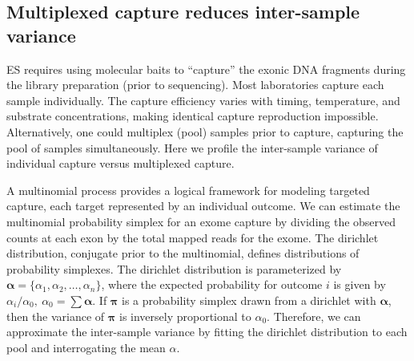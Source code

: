 \documentclass[11pt,letterpaper]{book}
\begin{document}
\hypertarget{multiplexed-capture-reduces-inter-sample-variance}{%
\subsection{Multiplexed capture reduces inter-sample variance}\label{multiplexed-capture-reduces-inter-sample-variance}}

ES requires using molecular baits to ``capture'' the exonic DNA fragments during the library preparation (prior to sequencing).
Most laboratories capture each sample individually.
The capture efficiency varies with timing, temperature, and substrate concentrations, making identical capture reproduction impossible.
Alternatively, one could multiplex (pool) samples prior to capture, capturing the pool of samples simultaneously.
Here we profile the inter-sample variance of individual capture versus multiplexed capture.

A multinomial process provides a logical framework for modeling targeted capture, each target represented by an individual outcome.
We can estimate the multinomial probability simplex for an exome capture by dividing the observed counts at each exon by the total mapped reads for the exome.
The dirichlet distribution, conjugate prior to the multinomial, defines distributions of probability simplexes.
The dirichlet distribution is parameterized by \(\boldsymbol{\alpha} = \{\alpha_1, \alpha_2, \dots, \alpha_n\}\), where the expected probability for outcome \(i\) is given by \(\alpha_i/\alpha_0,~\alpha_0 = \sum \boldsymbol\alpha\).
If \(\boldsymbol\pi\) is a probability simplex drawn from a dirichlet with \(\boldsymbol\alpha\), then the variance of \(\boldsymbol\pi\) is inversely proportional to \(\alpha_0\).
Therefore, we can approximate the inter-sample variance by fitting the dirichlet distribution to each pool and interrogating the mean \(\alpha\).
\end{document}
